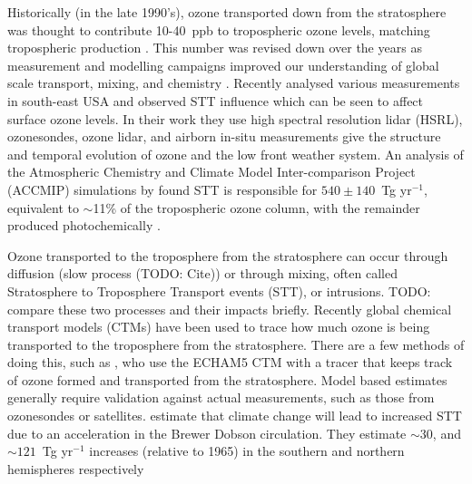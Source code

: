    Historically (in the late 1990's), ozone transported down from the stratosphere was thought to contribute 10-40~ppb to tropospheric ozone levels, matching tropospheric production \citep{Atkinson2000, Stohl2003}.
    This number was revised down over the years as measurement and modelling campaigns improved our understanding of global scale transport, mixing, and chemistry \citep{Monks2015}.
    Recently \cite{Kuang2017} analysed various measurements in south-east USA and observed STT influence which can be seen to affect surface ozone levels.
    In their work they use high spectral resolution lidar (HSRL), ozonesondes, ozone lidar, and airborn in-situ measurements give the structure and temporal evolution of ozone and the low front weather system.
    An analysis of the Atmospheric Chemistry and Climate Model Inter-comparison Project (ACCMIP) simulations by \citet{Young2013} found STT is responsible for $540\pm140$~Tg yr$^{-1}$, equivalent to $\sim$11\% of the tropospheric ozone column, with the remainder produced photochemically \citep{Monks2015}.
    
    Ozone transported to the troposphere from the stratosphere can occur through diffusion (slow process (TODO: Cite)) or through mixing, often called Stratosphere to Troposphere Transport events (STT), or intrusions.
    TODO: compare these two processes and their impacts briefly.
    Recently global chemical transport models (CTMs) have been used to trace how much ozone is being transported to the troposphere from the stratosphere.
    There are a few methods of doing this, such as \citet{Ojha2016}, who use the ECHAM5 CTM with a tracer that keeps track of ozone formed and transported from the stratosphere.
    Model based estimates generally require validation against actual measurements, such as those from ozonesondes or satellites.
    \citet{Hegglin2009} estimate that climate change will lead to increased STT due to an acceleration in the Brewer Dobson circulation.
    They estimate $\sim 30$, and $\sim 121$~Tg yr$^{-1}$ increases (relative to 1965) in the southern and northern hemispheres respectively
    
